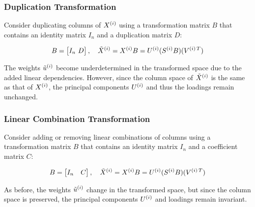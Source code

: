 \subsubsection{Duplication Transformation}
Consider duplicating columns of $X^{(i)}$ using a transformation matrix $B$ that contains an identity matrix $I_n$ and a duplication matrix $D$:

\begin{align}
B = \begin{bmatrix}
I_n \
D
\end{bmatrix}, \quad
\tilde{X}^{(i)} = X^{(i)}B = U^{(i)}(S^{(i)}B)(V^{(i)\,T}) \label{eq:duplication}
\end{align}

The weights $\tilde{u}^{(i)}$ become underdetermined in the transformed space due to the added linear dependencies. However, since the column space of $\tilde{X}^{(i)}$ is the same as that of $X^{(i)}$, the principal components $U^{(i)}$ and thus the loadings remain unchanged.

\subsubsection{Linear Combination Transformation}
Consider adding or removing linear combinations of columns using a transformation matrix $B$ that contains an identity matrix $I_n$ and a coefficient matrix $C$:

\begin{align}
B = \begin{bmatrix}
I_n & C
\end{bmatrix}, \quad
\tilde{X}^{(i)} = X^{(i)}B = U^{(i)}(S^{(i)}B)(V^{(i)\,T}) \label{eq:linear_combination}
\end{align}

As before, the weights $\tilde{u}^{(i)}$ change in the transformed space, but since the column space is preserved, the principal components $U^{(i)}$ and loadings remain invariant.

